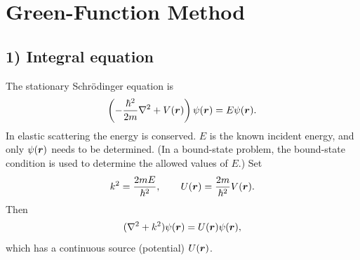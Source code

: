 \section{Green-Function Method}
\subsection*{1) Integral equation}
The stationary Schr\"odinger equation is
\begin{equation}
\left(-\frac{\hbar^2}{2m}\nabla^2+V(\bm{r})\right)\psi(\bm{r})=E\psi(\bm{r}).
\end{equation}
In elastic scattering the energy is conserved. $E$ is the known incident energy, and only $\psi(\bm{r})$ needs to be determined. (In a bound-state problem, the bound-state condition is used to determine the allowed values of $E$.) Set
\begin{equation}
k^2=\frac{2mE}{\hbar^2},\qquad U(\bm{r})=\frac{2m}{\hbar^2}V(\bm{r}).
\end{equation}
Then
\begin{equation}
(\nabla^2+k^2)\psi(\bm{r})=U(\bm{r})\psi(\bm{r}),
\end{equation}
which has a continuous source (potential) $U(\bm{r})$.


